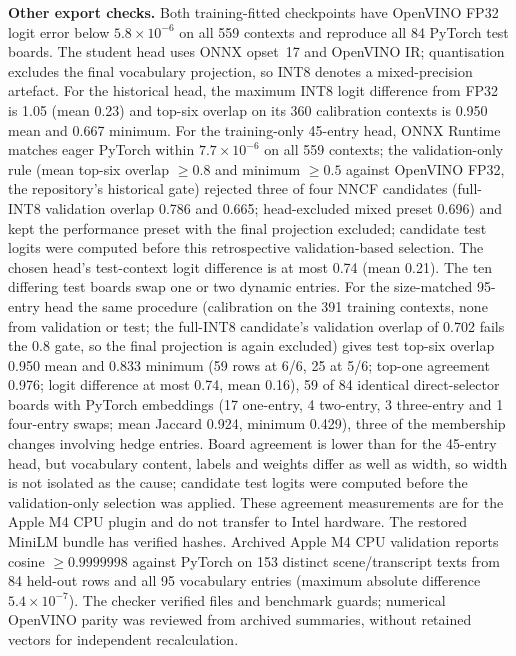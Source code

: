 \textbf{Other export checks.} Both training-fitted checkpoints have OpenVINO FP32 logit error below $5.8\times10^{-6}$ on all 559 contexts and reproduce all 84 PyTorch test boards. The student head uses ONNX opset~17 and OpenVINO IR; quantisation excludes the final vocabulary projection, so INT8 denotes a mixed-precision artefact. For the historical head, the maximum INT8 logit difference from FP32 is 1.05 (mean 0.23) and top-six overlap on its 360 calibration contexts is 0.950 mean and 0.667 minimum.
For the training-only 45-entry head, ONNX Runtime matches eager PyTorch within $7.7\times10^{-6}$ on all 559 contexts; the validation-only rule (mean top-six overlap $\geq0.8$ and minimum $\geq0.5$ against OpenVINO FP32, the repository's historical gate) rejected three of four NNCF candidates (full-INT8 validation overlap 0.786 and 0.665; head-excluded mixed preset 0.696) and kept the performance preset with the final projection excluded; candidate test logits were computed before this retrospective validation-based selection. The chosen head's test-context logit difference is at most 0.74 (mean 0.21). The ten differing test boards swap one or two dynamic entries. %
For the size-matched 95-entry head the same procedure (calibration on the 391 training contexts, none from validation or test; the full-INT8 candidate's validation overlap of 0.702 fails the 0.8 gate, so the final projection is again excluded) gives test top-six overlap 0.950 mean and 0.833 minimum (59 rows at 6/6, 25 at 5/6; top-one agreement 0.976; logit difference at most 0.74, mean 0.16), 59 of 84 identical direct-selector boards with PyTorch embeddings (17 one-entry, 4 two-entry, 3 three-entry and 1 four-entry swaps; mean Jaccard 0.924, minimum 0.429), three of the membership changes involving hedge entries. Board agreement is lower than for the 45-entry head, but vocabulary content, labels and weights differ as well as width, so width is not isolated as the cause; candidate test logits were computed before the validation-only selection was applied. These agreement measurements are for the Apple M4 CPU plugin and do not transfer to Intel hardware. %
The restored MiniLM bundle has verified hashes. Archived Apple M4 CPU validation reports cosine $\geq0.9999998$ against PyTorch on 153 distinct scene/transcript texts from 84 held-out rows and all 95 vocabulary entries (maximum absolute difference $5.4\times10^{-7}$). The checker verified files and benchmark guards; numerical OpenVINO parity was reviewed from archived summaries, without retained vectors for independent recalculation. %
